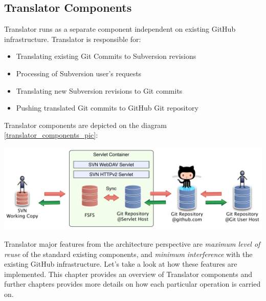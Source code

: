 \subsection{Translator Components}
\renewcommand{\figurename}{Figure}

Translator runs as a separate component independent on existing GitHub infrastructure. Translator is responsible for:
\begin{itemize}
  \item Translating existing Git Commits to Subversion revisions
  \item Processing of Subversion user's requests
  \item Translating new Subversion revisions to Git commits
  \item Pushing translated Git commits to GitHub Git repository
\end{itemize}
Translator components are depicted on the diagram \ref{translator_components_pic}:
\begin{center}
\includegraphics[width=\textwidth]{img/servlet/components_keep_github_safe.pdf}%
\label{translator_components_pic}%
\end{center}

Translator major features from the architecture perspective are \emph{maximum level of reuse} of the standard existing components, and \emph{minimum interference} with the existing GitHub infrastructure. 
Let's take a look at how these features are implemented. This chapter provides an overview of Translator components and further chapters provides more details on how each particular operation is carried on.

\label{srp}
